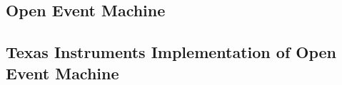 \subsection{Open Event Machine}
\subsection{Texas Instruments Implementation of Open Event Machine}
